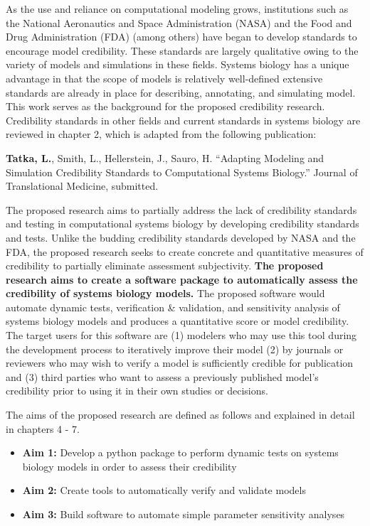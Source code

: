 \documentclass[12pt]{report}
\begin{document}
As the use and reliance on computational modeling grows, institutions such as the National Aeronautics and Space Administration (NASA) and the Food and Drug Administration (FDA) (among others)  have began to develop standards to encourage model credibility. These standards are largely qualitative owing to the variety of models and simulations in these fields. Systems biology has a unique advantage in that the scope of models is relatively well-defined extensive standards are already in place for describing, annotating, and simulating model. This work serves as the background for the proposed credibility research. Credibility standards in other fields and current standards in systems biology are reviewed in chapter 2, which is adapted from the following publication:
\\
\begin{adjustwidth}{2cm}{}
\textbf{Tatka, L.}, Smith, L., Hellerstein, J., Sauro, H. “Adapting Modeling and Simulation Credibility Standards to Computational Systems Biology.”   Journal of Translational Medicine, submitted.
\\
\end{adjustwidth}


The proposed research aims to partially address the lack of credibility standards and testing in computational systems biology by developing credibility standards and tests. Unlike the budding credibility standards developed by NASA and the FDA, the proposed research seeks to create concrete and quantitative measures of credibility to partially eliminate assessment subjectivity.  \textbf{The proposed research aims to create a software package to automatically assess the credibility of systems biology models.} The proposed software would automate dynamic tests, verification \& validation, and sensitivity analysis of systems biology models and produces a quantitative score or model credibility. The target users for this software are (1) modelers who may use this tool during the development process to iteratively improve their model (2) by journals or reviewers who may wish to verify a model is sufficiently credible for publication and (3) third parties who want to assess a previously published model's credibility prior to using it in their own studies or decisions.

The aims of the proposed research are defined as follows and explained in detail in chapters 4 - 7. 

\begin{itemize}
\item\textbf{Aim 1:} Develop a python package to perform dynamic tests on systems biology models in order to assess their credibility
\item\textbf{Aim 2:} Create tools to automatically verify and validate models
\item\textbf{Aim 3:} Build software to automate simple parameter sensitivity analyses
\end{itemize}
\end{document}
